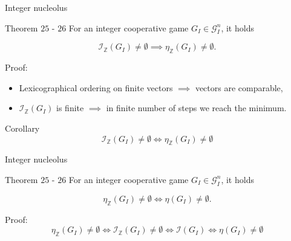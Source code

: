 \documentclass{beamer}
\newcommand{\Z}{\mathbb{Z}}
\begin{document}
\begin{frame}{Integer nucleolus}
    \begin{block}{Theorem $25$ - $26$}
        For an integer cooperative game $G_I \in \mathcal{G}_I^n$, it holds

        \begin{displaymath}
            \mathcal{I}_{\Z}(G_I) \neq \emptyset \implies \eta_\Z(G_I) \neq \emptyset.
        \end{displaymath}
    \end{block}
    Proof:
    \begin{itemize}
        \item Lexicographical ordering on finite vectors $\implies$ vectors are comparable,
        \item $\mathcal{I}_{\Z}(G_I)$ is finite $\implies$ in finite number of steps we reach the minimum.
    \end{itemize}

    \begin{block}{Corollary}
        \begin{displaymath}
            \mathcal{I}_{\Z}(G_I) \neq \emptyset \iff \eta_\Z(G_I) \neq \emptyset
        \end{displaymath}
    \end{block}
\end{frame}



\begin{frame}{Integer nucleolus}
    \begin{block}{Theorem $25$ - $26$}
        For an integer cooperative game $G_I \in \mathcal{G}_I^n$, it holds

        \begin{displaymath}
            \eta_\Z(G_I) \neq \emptyset \iff \eta(G_I) \neq \emptyset.
        \end{displaymath}
    \end{block}
    Proof:
    \begin{displaymath}
        \eta_\Z(G_I) \neq \emptyset \iff \mathcal{I}_{\Z}(G_I) \neq \emptyset \iff \mathcal{I}(G_I) \iff \eta(G_I) \neq \emptyset
    \end{displaymath}
\end{frame}


\end{document}
